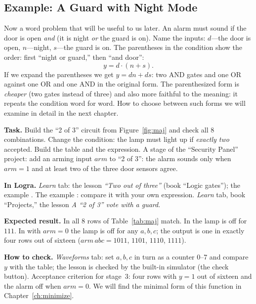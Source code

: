 \subsection{Example: A Guard with Night Mode}

Now a word problem that will be useful to us later. An alarm must sound if
the door is open \emph{and} (it is night \emph{or} the guard is on). Name the
inputs: $d$---the door is open, $n$---night, $s$---the guard is on. The
parentheses in the condition show the order: first ``night or guard,'' then
``and door'':
\[
  y = d\cdot(n + s).
\]
If we expand the parentheses we get $y = dn + ds$: two AND gates and one OR
against one OR and one AND in the original form. The parenthesized form is
\emph{cheaper} (two gates instead of three) and also more faithful to the
meaning: it repeats the condition word for word. How to choose between such
forms we will examine in detail in the next chapter.

\begin{diybox}
\textbf{Task.}  Build the ``2 of 3'' circuit from
Figure~\ref{fig:maj} and check all 8 combinations.  Change the
condition: the lamp must light up if \emph{exactly two} accepted. Build the
table and the expression.  A stage of the ``Security Panel''
project: add an arming input $arm$ to ``2 of 3'': the alarm sounds only when
$arm=1$ and at least two of the three door sensors agree.

\textbf{In Logra.}  \emph{Learn} tab: the lesson
\emph{``Two out of three''} (book ``Logic gates''); the example
.  The example : compare it with
your own expression.  \emph{Learn} tab, book ``Projects,'' the
lesson \emph{A ``2 of 3'' vote with a guard}.

\textbf{Expected result.} In  all 8 rows of Table~\ref{tab:maj}
match. In  the lamp is off for $111$. In  with $arm=0$ the
lamp is off for any $a,b,c$; the output is one in exactly four rows out of
sixteen ($arm\,abc=1011$, $1101$, $1110$, $1111$).

\textbf{How to check.} \emph{Waveforms} tab: set $a,b,c$ in turn as a
counter 0--7 and compare $y$ with the table; the lesson is checked by the
built-in simulator (the check button). Acceptance criterion for stage~3: four
rows with $y=1$ out of sixteen and the alarm off when $arm=0$. We will find
the minimal form of this function in Chapter~\ref{ch:minimize}.
\end{diybox}

